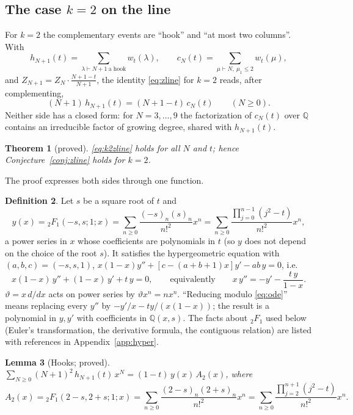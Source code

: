 \documentclass[11pt]{article}
\newtheorem{theorem}{Theorem}[section]
\newtheorem{lemma}[theorem]{Lemma}
\theoremstyle{definition}
\newtheorem{definition}[theorem]{Definition}
\theoremstyle{remark}
\newcommand{\F}[4]{{}_2F_1\!\left(#1,#2;#3;#4\right)}
\begin{document}
\subsection{The case $k=2$ on the line}

For $k=2$ the complementary events are ``hook'' and ``at most two columns''. With
\[
h_{N+1}(t)=\sum_{\lambda\vdash N+1\ \text{a hook}}w_t(\lambda),\qquad c_N(t)=\sum_{\mu\vdash N,\ \mu_1\le2}w_t(\mu),
\]
and $Z_{N+1}=Z_N\cdot\frac{N+1-t}{N+1}$, the identity \eqref{eq:zline} for $k=2$ reads, after complementing,
\begin{equation}\label{eq:k2zline}
(N+1)\,h_{N+1}(t)=(N+1-t)\,c_N(t)\qquad(N\ge0).
\end{equation}
Neither side has a closed form: for $N=3,\dots,9$ the factorization of $c_N(t)$ over $\mathbb Q$ contains an irreducible factor of growing degree, shared with $h_{N+1}(t)$.

\begin{theorem}[proved]\label{thm:k2z}
\eqref{eq:k2zline} holds for all $N$ and $t$; hence Conjecture~\ref{conj:zline} holds for $k=2$.
\end{theorem}

The proof expresses both sides through one function.

\begin{definition}\label{def:y}
Let $s$ be a square root of $t$ and
\[
y(x)=\F{-s}{s}{1}{x}=\sum_{n\ge0}\frac{(-s)_n(s)_n}{n!^2}x^n=\sum_{n\ge0}\frac{\prod_{j=0}^{n-1}(j^2-t)}{n!^2}x^n ,
\]
a power series in $x$ whose coefficients are polynomials in $t$ (so $y$ does not depend on the choice of the root $s$). It satisfies the hypergeometric equation with $(a,b,c)=(-s,s,1)$, $x(1-x)y''+[c-(a+b+1)x]y'-ab\,y=0$, i.e.
\begin{equation}\label{eq:ode}
x(1-x)\,y''+(1-x)\,y'+t\,y=0,\qquad\text{equivalently}\qquad x\,y''=-y'-\frac{t\,y}{1-x}.
\end{equation}
$\vartheta=x\,d/dx$ acts on power series by $\vartheta x^n=nx^n$. ``Reducing modulo \eqref{eq:ode}'' means replacing every $y''$ by $-y'/x-ty/(x(1-x))$; the result is a polynomial in $y,y'$ with coefficients in $\mathbb Q(x,s)$. The facts about ${}_2F_1$ used below (Euler's transformation, the derivative formula, the contiguous relation) are listed with references in Appendix~\ref{app:hyper}.
\end{definition}

\begin{lemma}[Hooks; proved]\label{lem:hooks}
$\displaystyle\sum_{N\ge0}(N+1)^2\,h_{N+1}(t)\,x^N=(1-t)\,y(x)\,A_2(x)$, where
\[
A_2(x)=\F{2-s}{2+s}{1}{x}=\sum_{n\ge0}\frac{(2-s)_n(2+s)_n}{n!^2}x^n=\sum_{n\ge0}\frac{\prod_{j=2}^{n+1}(j^2-t)}{n!^2}x^n .
\]
\end{lemma}
\end{document}
